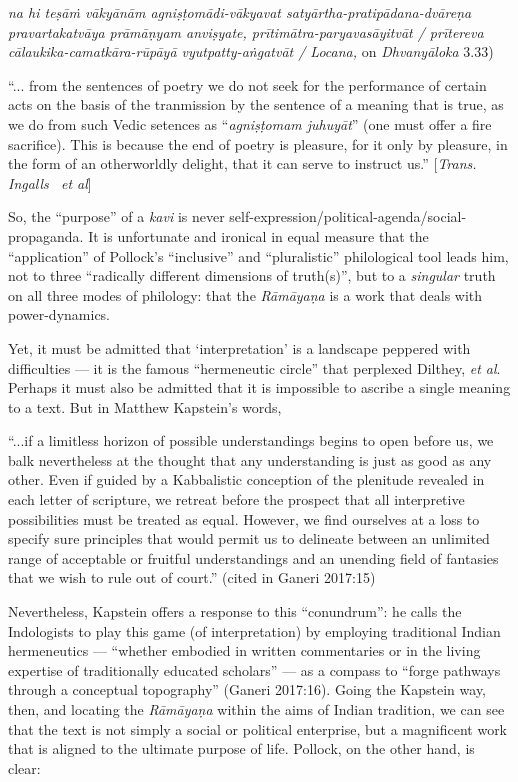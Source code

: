 \begin{myquote}
{{\sl na hi teṣāṁ vākyānām agniṣṭomādi-vākyavat satyārtha-pratipādana-dvāreṇa pravartakatvāya prāmāṇyam anviṣyate, prītimātra-paryavasāyitvāt / prītereva cālaukika-camatkāra-rūpāyā vyutpatty-aṅgatvāt / Locana,}} on {\sl Dhvanyāloka} 3.33)


 “... from the sentences of poetry we do not seek for the performance of certain acts on the basis of the tranmission by the sentence of a meaning that is true, as we do from such Vedic setences as “{\sl agniṣṭomam juhuyāt}” (one must offer a fire sacrifice). This is because the end of poetry is pleasure, for it only by pleasure, in the form of an otherworldly delight, that it can serve to instruct us.”
\hfill  [{\sl Trans. Ingalls~ et al}]
\end{myquote}

So, the “purpose” of a {\sl kavi} is never self-expression/political-agenda/\-social-propaganda. It is unfortunate and ironical in equal measure that the “application” of Pollock’s “inclusive” and “pluralistic” philological tool leads him, not to three “radically different dimensions of truth(s)”, but to a {\sl singular} truth on all three modes of philology: that the {\sl Rāmāyaṇa} is a work that deals with power-dynamics. 

Yet, it must be admitted that ‘interpretation’ is a landscape peppered with difficulties — it is the famous “hermeneutic circle” that perplexed Dilthey, {\sl et al}. Perhaps it must also be admitted that it is impossible to ascribe a single meaning to a text. But in Matthew Kapstein’s words, 

\begin{myquote}
“...if a limitless horizon of possible understandings begins to open before us, we balk nevertheless at the thought that any understanding is just as good as any other. Even if guided by a Kabbalistic conception of the plenitude revealed in each letter of scripture, we retreat before the prospect that all interpretive possibilities must be treated as equal. However, we find ourselves at a loss to specify sure principles that would permit us to delineate between an unlimited range of acceptable or fruitful understandings and an unending field of fantasies that we wish to rule out of court.”
\hfill (cited in Ganeri 2017:15) 
\end{myquote}

Nevertheless, Kapstein offers a response to this “conundrum”: he calls the Indologists to play this game (of interpretation) by employing traditional Indian hermeneutics — “whether embodied in written commentaries or in the living expertise of traditionally educated scholars” — as a compass to “forge pathways through a conceptual topography” (Ganeri 2017:16). Going the Kapstein way, then, and locating the {\sl Rāmāyaṇa} within the aims of Indian tradition, we can see that the text is not simply a social or political enterprise, but a magnificent work that is aligned to the ultimate purpose of life. Pollock, on the other hand, is clear:

